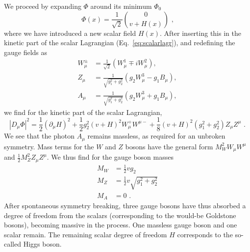 We proceed by expanding $\Phi$ around its minimum $\Phi_0$
\begin{equation}
  \Phi(x) = \frac{1}{\sqrt{2}} \binom{0}{ v + H(x) } \textrm{ ,}
  \label{eq:higgsexpansion}
\end{equation}
where we have introduced a new scalar field $H(x)$.
After inserting this in the kinetic part of the scalar Lagrangian (Eq.~\ref{eq:scalarlagr}), and
redefining the gauge fields as
\begin{align}
  W^\pm_\mu &= \frac{1}{\sqrt{2}} (W_\mu^1 \mp i W_\mu^2), \\
  Z_\mu &= \frac{1}{\sqrt{g_1^2 + g_2^2}} (g_2W_\mu^3 - g_1 B_\mu),\\
  A_\mu &= \frac{1}{\sqrt{g_1^2 + g_2^2}} (g_2W_\mu^3 + g_1 B_\mu) ,
\end{align}
we find for the kinetic part of the scalar Lagrangian,
\begin{equation}
  |D_\mu \Phi|^2 = \frac{1}{2} (\partial_\mu H)^2 + \frac{1}{2}g_2^2(v+H)^2 W^+_\mu W^{\mu -} +
\frac{1}{8}(v+H)^2 (g_1^2 + g_2^2) Z_\mu Z^\mu \textrm{ .}
\end{equation}
We see that the photon $A_\mu$ remains massless, as required for an unbroken symmetry. Mass terms
for the $W$ and $Z$ bosons have the general form $M_W^2 W_\mu W^\mu$ and $ \frac{1}{2} M_Z^2 Z_\mu
Z^\mu$. We thus find for the gauge boson masses
\begin{align}
  M_W &= \frac{1}{2} v g_2 \\
  M_Z &= \frac{1}{2} v \sqrt{g_1^2 + g_2^2} \\
  M_A &= 0 \textrm{ .}
\end{align}
After spontaneous symmetry breaking, three gauge bosons have thus absorbed a degree of freedom from
the scalars (corresponding to the would-be Goldstone bosons), becoming massive in the process. One
massless gauge boson and one scalar remain.
The remaining scalar degree of freedom $H$ corresponds to the so-called Higgs boson. 

